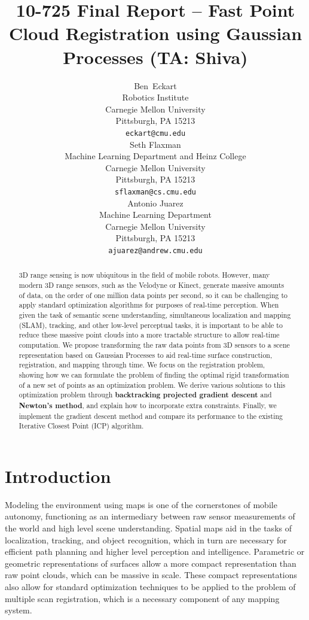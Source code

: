 \documentclass{article} %
\title{10-725 Final Report -- Fast Point Cloud Registration using Gaussian Processes (TA: Shiva)}
\author{
Ben~Eckart\\
Robotics Institute\\
Carnegie Mellon University\\
Pittsburgh, PA 15213 \\
\texttt{eckart@cmu.edu} \\
\And
Seth Flaxman \\
Machine Learning Department and Heinz College\\
Carnegie Mellon University\\
Pittsburgh, PA 15213 \\
\texttt{sflaxman@cs.cmu.edu} \\
\And
Antonio Juarez \\
Machine Learning Department\\
Carnegie Mellon University\\
Pittsburgh, PA 15213 \\
\texttt{ajuarez@andrew.cmu.edu} \\
}
\begin{document}
\maketitle

\begin{abstract}

3D range sensing is now ubiquitous in the field of mobile robots. However, many modern 3D range sensors, such as the Velodyne or Kinect, generate massive amounts of data, on the order of one million data points per second,  so it can be challenging to apply standard optimization algorithms for purposes of real-time perception. When given the task of semantic scene understanding, simultaneous localization and mapping (SLAM), tracking, and other low-level perceptual tasks, it is important to be able to reduce these massive point clouds into a more tractable structure to allow real-time computation. We propose transforming the raw data points from 3D sensors to a scene representation based on Gaussian Processes to aid real-time surface construction, registration, and mapping through time. We focus on the registration problem, showing how we can formulate the problem of finding the optimal rigid transformation of a new set of points as an optimization problem. We derive various solutions to this optimization problem through {\bf backtracking projected gradient descent} and {\bf Newton's method}, and explain how to incorporate extra constraints. Finally, we implement the gradient descent method and compare its performance to the existing Iterative Closest Point (ICP) algorithm.

\end{abstract}

\section{Introduction}

Modeling the environment using maps is one of the cornerstones of mobile autonomy, functioning as an intermediary between raw sensor measurements of the world and high level scene understanding. Spatial maps aid in the tasks of localization, tracking, and object recognition, which in turn are necessary for efficient path planning and higher level perception and intelligence. Parametric or geometric representations of surfaces allow a more compact representation than raw point clouds, which can be massive in scale. These compact representations also allow for standard optimization techniques to be applied to the problem of multiple scan registration, which is a necessary component of any mapping system.
\end{document}
